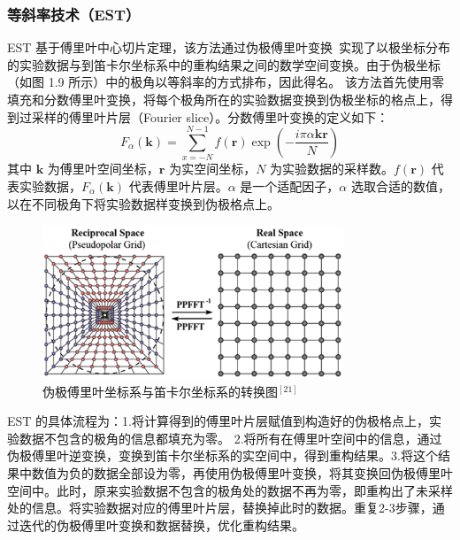 \subsubsection{等斜率技术（EST）}
EST 基于傅里叶中心切片定理，该方法通过伪极傅里叶变换~\cite{Averbuch2006}实现了以极坐标分布的实验数据与到笛卡尔坐标系中的重构结果之间的数学空间变换。由于伪极坐标（如图 1.9 所示）中的极角以等斜率的方式排布，因此得名。
该方法首先使用零填充和分数傅里叶变换，将每个极角所在的实验数据变换到伪极坐标的格点上，得到过采样的傅里叶片层（Fourier slice）。分数傅里叶变换的定义如下：
\begin{equation}
F_{\alpha}(\boldsymbol{k})=\sum_{x=-N}^{N-1}f(\boldsymbol{r})\exp\left(-\frac{i\pi\alpha\boldsymbol{k}\boldsymbol{r}}{N}\right)
\end{equation}
其中 $\boldsymbol{k}$ 为傅里叶空间坐标，$\boldsymbol{r}$ 为实空间坐标，$N$ 为实验数据的采样数。$f(\boldsymbol{r})$ 代表实验数据，$F_{\alpha} (\boldsymbol{k})$ 代表傅里叶片层。$\alpha$ 是一个适配因子，$\alpha$ 选取合适的数值，以在不同极角下将实验数据样变换到伪极格点上。

\begin{figure}[htbp]
	\vspace{\baselineskip}
	\centering
	\includegraphics[width=0.8\textwidth]{../1.9/1_9}
	\caption{伪极傅里叶坐标系与笛卡尔坐标系的转换图$^{[21]}$}\label{fig:19}
\end{figure}

EST 的具体流程为：1.将计算得到的傅里叶片层赋值到构造好的伪极格点上，实验数据不包含的极角的信息都填充为零。
2.将所有在傅里叶空间中的信息，通过伪极傅里叶逆变换，变换到笛卡尔坐标系的实空间中，得到重构结果。3.将这个结果中数值为负的数据全部设为零，再使用伪极傅里叶变换，将其变换回伪极傅里叶空间中。此时，原来实验数据不包含的极角处的数据不再为零，即重构出了未采样处的信息。将实验数据对应的傅里叶片层，替换掉此时的数据。重复2-3步骤，通过迭代的伪极傅里叶变换和数据替换，优化重构结果。

